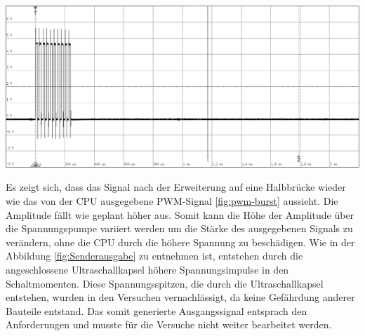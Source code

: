 \begin{minipage}{0.5\textwidth}
\includegraphics[width=1\textwidth%
]{Abbildungen/MessungenP1/PWM-Nach-der-Halbbrucke-mit-LS.png}
\label{fig:Senderausgabe}
\end{minipage}
Es zeigt sich, dass das Signal nach der Erweiterung auf eine Halbbrücke wieder wie das von der CPU ausgegebene PWM-Signal \ref{fig:pwm-burst} aussieht. Die Amplitude fällt wie geplant höher aus. Somit kann die Höhe der Amplitude über die Spannungspumpe variiert werden um die Stärke des ausgegebenen Signals zu verändern, ohne die CPU durch die höhere Spannung zu beschädigen. Wie in der Abbildung \ref{fig:Senderausgabe} zu entnehmen ist, entstehen durch die angeschlossene Ultraschallkapsel höhere Spannungsimpulse in den Schaltmomenten. Diese Spannungsspitzen, die durch die Ultraschallkapsel entstehen, wurden in den Versuchen vernachlässigt, da keine Gefährdung anderer Bauteile entstand. Das somit generierte Ausgangssignal entsprach den Anforderungen und musste für die Versuche nicht weiter bearbeitet werden.
